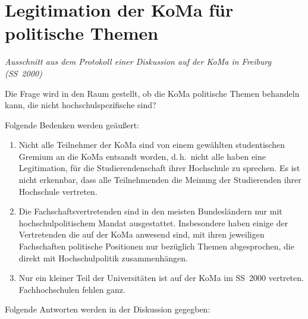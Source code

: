 \chapter{Legitimation der KoMa für politische Themen}

\emph{Ausschnitt aus dem Protokoll einer Diskussion auf der KoMa in Freiburg
(SS~2000)}

Die Frage wird in den Raum gestellt, ob die KoMa politische Themen behandeln
kann, die nicht hochschulspezifische sind?

Folgende Bedenken werden geäußert:
\begin{enumerate}
\item Nicht alle Teilnehmer der KoMa sind von einem gewählten studentischen
	Gremium an die KoMa entsandt worden, d.\,h.\ nicht alle haben eine
	Legitimation, für die Studierendenschaft ihrer Hochschule zu sprechen.  Es
	ist nicht erkennbar, dass alle Teilnehmenden die Meinung der Studierenden
	ihrer Hochschule vertreten.
\item Die Fachschaftsvertretenden sind in den meisten Bundesländern nur mit
	hochschulpolitischem Mandat ausgestattet.  Insbesondere haben einige der
	Vertretenden die auf der KoMa anwesend sind, mit ihren jeweiligen
	Fachschaften politische Positionen nur bezüglich Themen abgesprochen, die
	direkt mit Hochschulpolitik zusammenhängen.
\item Nur ein kleiner Teil der Universitäten ist auf der KoMa im SS~2000
	vertreten. Fachhochschulen fehlen ganz.
\end{enumerate}

Folgende Antworten werden in der Diskussion gegegben:

